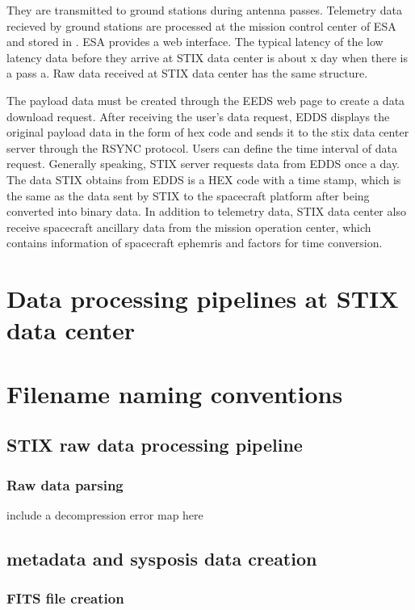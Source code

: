 \documentclass{aa}
\begin{document}
They are transmitted to ground stations during antenna passes.
Telemetry data recieved by ground stations are processed at the mission control center of ESA and
stored in .
ESA provides a web interface.
The typical latency of the low latency data before they arrive at STIX data center is about x day when there is a pass a.
Raw data received at STIX data center has the same structure.

The payload data must be created through the EEDS web page to create a data download request.
After receiving the user's data request, EDDS displays the original payload data in the form of hex code and sends it to the stix data center server through the RSYNC protocol. Users can define the time interval of data request. Generally speaking, STIX server requests data from EDDS once a day. The data STIX obtains from EDDS is a HEX code with a time stamp, which is the same as the data sent by STIX to the spacecraft platform after being converted into binary data.
In addition to telemetry data, STIX data center also receive spacecraft ancillary data from
the mission operation center, which contains
information of spacecraft ephemris and factors for time conversion.


\section{Data processing pipelines at STIX data center}


\section{Filename naming conventions}

\subsection{STIX raw data processing pipeline}
\subsubsection{Raw data parsing}

include a decompression error map here

\subsection{metadata and sysposis data creation}

\subsubsection{FITS file creation}
\end{document}
